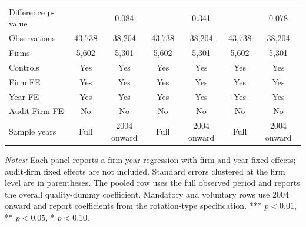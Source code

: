 \documentclass[10pt]{article}
\begin{document}
\begin{minipage}{19cm}
\begin{threeparttable}
\begin{tabular}{l cc cc cc}
Difference p-value &  & 0.084 &  & 0.341 &  & 0.078 \\
Observations & 43,738 & 38,204 & 43,738 & 38,204 & 43,738 & 38,204 \\
Firms & 5,602 & 5,301 & 5,602 & 5,301 & 5,602 & 5,301 \\
\midrule
Controls & Yes & Yes & Yes & Yes & Yes & Yes \\
Firm FE & Yes & Yes & Yes & Yes & Yes & Yes \\
Year FE & Yes & Yes & Yes & Yes & Yes & Yes \\
Audit Firm FE & No & No & No & No & No & No \\
Sample years & Full & 2004 onward & Full & 2004 onward & Full & 2004 onward \\
\bottomrule
\end{tabular}
\begin{tablenotes}\fontsize{9}{11}\selectfont
\item \fontsize{9}{11}\selectfont \textit{Notes:} Each panel reports a firm-year regression with firm and year fixed effects; audit-firm fixed effects are not included. Standard errors clustered at the firm level are in parentheses. The pooled row uses the full observed period and reports the overall quality-dummy coefficient. Mandatory and voluntary rows use 2004 onward and report coefficients from the rotation-type specification. *** \(p<0.01\), ** \(p<0.05\), * \(p<0.10\).
\end{tablenotes}
\end{threeparttable}

\end{minipage}
\end{document}
